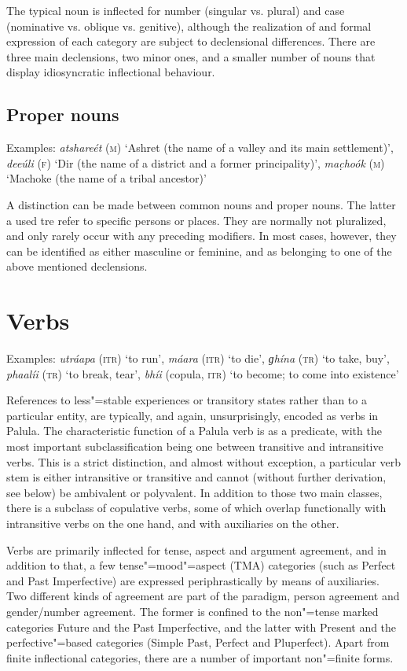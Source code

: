 The typical noun is inflected for number (singular vs. plural) and case (nominative vs. oblique vs. genitive), although the realization of and formal expression of each category are subject to declensional differences. There are three main declensions, two minor ones, and a smaller number of nouns that display idiosyncratic inflectional behaviour.


\subsection{Proper nouns}
\label{subsec:3b-2-1}
Examples: \textit{atshareét} (\textsc{m}) `Ashret (the name of a valley and its main settlement)', \textit{deeúli} (\textsc{f}) `Dir (the name of a district and a former principality)', \textit{mac̣hoók} (\textsc{m}) `Machoke (the name of a tribal ancestor)'


A distinction can be made between common nouns and proper nouns. The latter a used tre refer to specific persons or places. They are normally not pluralized, and only rarely occur with any preceding modifiers. In most cases, however, they can be identified as either masculine or feminine, and as belonging to one of the above mentioned declensions.

\section{Verbs}
\label{sec:3b-3}

Examples: \textit{utráapa} (\textsc{itr}) `to run', \textit{máara} (\textsc{itr}) `to die', \textit{ɡhína} (\textsc{tr}) `to take, buy', \textit{phaalíi} (\textsc{tr}) `to break, tear', \textit{bhíi} (copula, \textsc{itr}) `to become; to come into existence'


References to less"=stable experiences or transitory states rather than to a particular entity, are typically, and again, unsurprisingly, encoded as verbs in Palula. The characteristic function of a Palula verb is as a predicate, with the most important subclassification being one between transitive and intransitive verbs. This is a strict distinction, and almost without exception, a particular verb stem is either intransitive or transitive and cannot (without further derivation, see below) be ambivalent or polyvalent. In addition to those two main classes, there is a subclass of copulative verbs, some of which overlap functionally with intransitive verbs on the one hand, and with auxiliaries on the other.


Verbs are primarily inflected for tense, aspect and argument agreement, and in addition to that, a few tense"=mood"=aspect (TMA) categories (such as Perfect and Past Imperfective) are expressed periphrastically by means of auxiliaries. Two different kinds of agreement are part of the paradigm, person agreement and gender/number agreement. The former is confined to the non"=tense marked categories Future and the Past Imperfective, and the latter with Present and the perfective"=based categories (Simple Past, Perfect and Pluperfect). Apart from finite inflectional categories, there are a number of important non"=finite forms.


